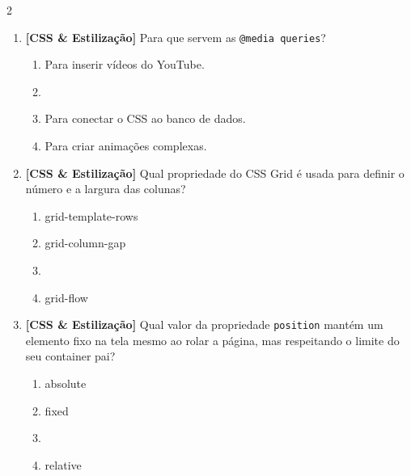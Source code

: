 \documentclass[a4paper,10pt]{article}
\begin{document}
\begin{multicols*}{2}
\begin{enumerate}[label=\textbf{\arabic*.}, resume, leftmargin=*]
\item \textbf{[CSS \& Estilização]} Para que servem as \texttt{@media queries}?
\begin{enumerate}[label=(\alph*), noitemsep]
  \item Para inserir vídeos do YouTube.
  \item {}
  \item Para conectar o CSS ao banco de dados.
  \item Para criar animações complexas.
\end{enumerate}

\item \textbf{[CSS \& Estilização]} Qual propriedade do CSS Grid é usada para definir o número e a largura das colunas?
\begin{enumerate}[label=(\alph*), noitemsep]
  \item grid-template-rows
  \item grid-column-gap
  \item {}
  \item grid-flow
\end{enumerate}

\item \textbf{[CSS \& Estilização]} Qual valor da propriedade \texttt{position} mantém um elemento fixo na tela mesmo ao rolar a página, mas respeitando o limite do seu container pai?
\begin{enumerate}[label=(\alph*), noitemsep]
  \item absolute
  \item fixed
  \item {}
  \item relative
\end{enumerate}

\end{enumerate}
\end{multicols*}
\newpage
\end{document}
